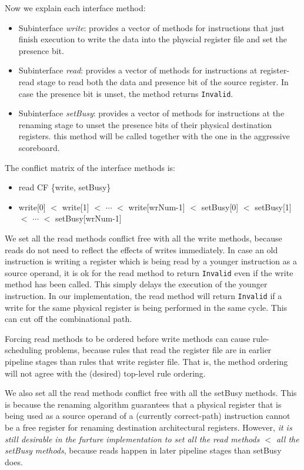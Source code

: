 Now we explain each interface method:
\begin{itemize}
    \item Subinterface \emph{write}: provides a vector of methods for instructions that just finish execution to write the data into the physcial register file and set the presence bit.
    \item Subinterface \emph{read}: provides a vector of methods for instructions at register-read stage to read both the data and presence bit of the source register.
    In case the presence bit is unset, the method returns \texttt{Invalid}.
    \item Subinterface \emph{setBusy}: provides a vector of methods for instructions at the renaming stage to unset the presence bits of their physical destination registers.
    this method will be called together with the one in the aggressive scoreboard.
\end{itemize}

The conflict matrix of the interface methods is:
\begin{itemize}
    \item read CF \{write, setBusy\}
    \item write[0] $<$ write[1] $<$ $\cdots$ $<$ write[wrNum-1] $<$ setBusy[0] $<$ setBusy[1] $<$ $\cdots$ $<$ setBusy[wrNum-1]
\end{itemize}
We set all the read methods conflict free with all the write methods, because reads do not need to reflect the effects of writes immediately.
In case an old instruction is writing a register which is being read by a younger instruction as a source operand, it is ok for the read method to return \texttt{Invalid} even if the write method has been called.
This simply delays the execution of the younger instruction.
In our implementation, the read method will return \texttt{Invalid} if a write for the same physical register is being performed in the same cycle.
This can cut off the combinational path.

Forcing read methods to be ordered before write methods can cause rule-scheduling problems, because rules that read the register file are in earlier pipeline stages than rules that write register file.
That is, the method ordering will not agree with the (desired) top-level rule ordering.

We also set all the read methods conflict free with all the setBusy methods.
This is because the renaming algorithm guarantees that a physical register that is being used as a source operand of a (currently correct-path) instruction cannot be a free register for renaming destination architectural registers.
However, \emph{it is still desirable in the furture implementation to set all the read methods $<$ all the setBusy methods}, because reads happen in later pipeline stages than setBusy does.

